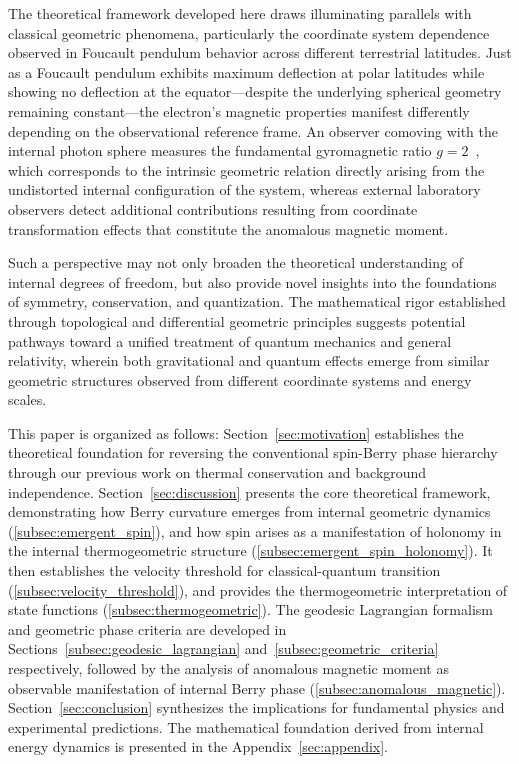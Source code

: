 \documentclass[%
 reprint,
 amsmath,amssymb,
 aps,
]{revtex4-1}
\numberwithin{equation}{section}%
\begin{document}
The theoretical framework developed here draws illuminating parallels with classical geometric phenomena, particularly the coordinate system dependence observed in Foucault pendulum behavior across different terrestrial latitudes. Just as a Foucault pendulum exhibits maximum deflection at polar latitudes while showing no deflection at the equator—despite the underlying spherical geometry remaining constant—the electron's magnetic properties manifest differently depending on the observational reference frame. An observer comoving with the internal photon sphere measures the fundamental gyromagnetic ratio $g = 2$~\cite{hanamura2309.0047}, which corresponds to the intrinsic geometric relation directly arising from the undistorted internal configuration of the system, whereas external laboratory observers detect additional contributions resulting from coordinate transformation effects that constitute the anomalous magnetic moment.

Such a perspective may not only broaden the theoretical understanding of internal degrees of freedom, but also provide novel insights into the foundations of symmetry, conservation, and quantization. The mathematical rigor established through topological and differential geometric principles suggests potential pathways toward a unified treatment of quantum mechanics and general relativity, wherein both gravitational and quantum effects emerge from similar geometric structures observed from different coordinate systems and energy scales.

This paper is organized as follows: Section~\ref{sec:motivation} establishes the theoretical foundation for reversing the conventional spin-Berry phase hierarchy through our previous work on thermal conservation and background independence. Section~\ref{sec:discussion} presents the core theoretical framework, demonstrating how Berry curvature emerges from internal geometric dynamics (\ref{subsec:emergent_spin}), and how spin arises as a manifestation of holonomy in the internal thermogeometric structure (\ref{subsec:emergent_spin_holonomy}). It then establishes the velocity threshold for classical-quantum transition (\ref{subsec:velocity_threshold}), and provides the thermogeometric interpretation of state functions (\ref{subsec:thermogeometric}). The geodesic Lagrangian formalism and geometric phase criteria are developed in Sections~\ref{subsec:geodesic_lagrangian} and~\ref{subsec:geometric_criteria} respectively, followed by the analysis of anomalous magnetic moment as observable manifestation of internal Berry phase (\ref{subsec:anomalous_magnetic}). Section~\ref{sec:conclusion} synthesizes the implications for fundamental physics and experimental predictions. The mathematical foundation derived from internal energy dynamics is presented in the Appendix~\ref{sec:appendix}.
\end{document}
